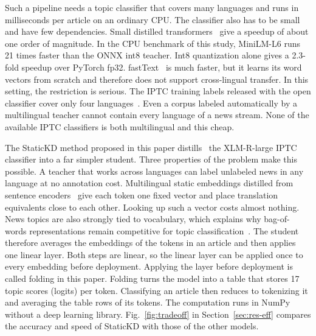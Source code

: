 \documentclass[journal]{IEEEtran}
\begin{document}
Such a pipeline needs a topic classifier that covers many languages and runs in milliseconds per article on an ordinary CPU. The classifier also has to be small and have few dependencies. Small distilled transformers~\cite{sanh2019distilbert,wang2021minilmv2} give a speedup of about one order of magnitude. In the CPU benchmark of this study, MiniLM-L6 runs 21 times faster than the ONNX int8 teacher. Int8 quantization alone gives a 2.3-fold speedup over PyTorch fp32. fastText~\cite{joulin2017bag} is much faster, but it learns its word vectors from scratch and therefore does not support cross-lingual transfer. In this setting, the restriction is serious. The IPTC training labels released with the open classifier cover only four languages~\cite{emmediatopic2025}. Even a corpus labeled automatically by a multilingual teacher cannot contain every language of a news stream. None of the available IPTC classifiers is both multilingual and this cheap.

The StaticKD method proposed in this paper distills~\cite{hinton2015distilling} the XLM-R-large IPTC classifier into a far simpler student. Three properties of the problem make this possible. A teacher that works across languages can label unlabeled news in any language at no annotation cost. Multilingual static embeddings distilled from sentence encoders~\cite{tulkens2024model2vec,wada2025static,chen2024bgem3} give each token one fixed vector and place translation equivalents close to each other. Looking up such a vector costs almost nothing. News topics are also strongly tied to vocabulary, which explains why bag-of-words representations remain competitive for topic classification~\cite{galke2022bow}. The student therefore averages the embeddings of the tokens in an article and then applies one linear layer. Both steps are linear, so the linear layer can be applied once to every embedding before deployment. Applying the layer before deployment is called folding in this paper. Folding turns the model into a table that stores 17 topic scores (logits) per token. Classifying an article then reduces to tokenizing it and averaging the table rows of its tokens. The computation runs in NumPy without a deep learning library. Fig.~\ref{fig:tradeoff} in Section~\ref{sec:res-eff} compares the accuracy and speed of StaticKD with those of the other models.
\end{document}
